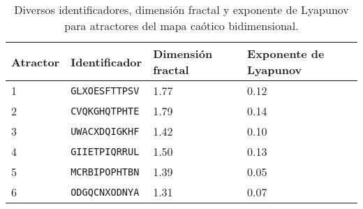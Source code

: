         \begin{table}[htbp]
            \centering
            \caption{Diversos identificadores, dimensión fractal y exponente de Lyapunov para atractores del mapa caótico bidimensional.}
            \begin{tabular}{|l|l|l|l|}
                \hline
                \rowcolor{lightgray}  Atractor & Identificador & Dimensión fractal & Exponente de Lyapunov \\
                \hline
                1     & \verb|GLXOESFTTPSV| & 1.77  & 0.12   \\ %
                \hline
                2     & \verb|CVQKGHQTPHTE| & 1.79  & 0.14   \\ %
                \hline
                3     & \verb|UWACXDQIGKHF| & 1.42  & 0.10   \\ %
    \hline
                4    &  \verb|GIIETPIQRRUL| & 1.50  & 0.13   \\ %
                \hline
                5     & \verb|MCRBIPOPHTBN| & 1.39  & 0.05   \\ %
                \hline
                6     & \verb|ODGQCNXODNYA| & 1.31  & 0.07   \\ %
                \hline
            \end{tabular}
            \label{tab:codificacion}
        \end{table}

